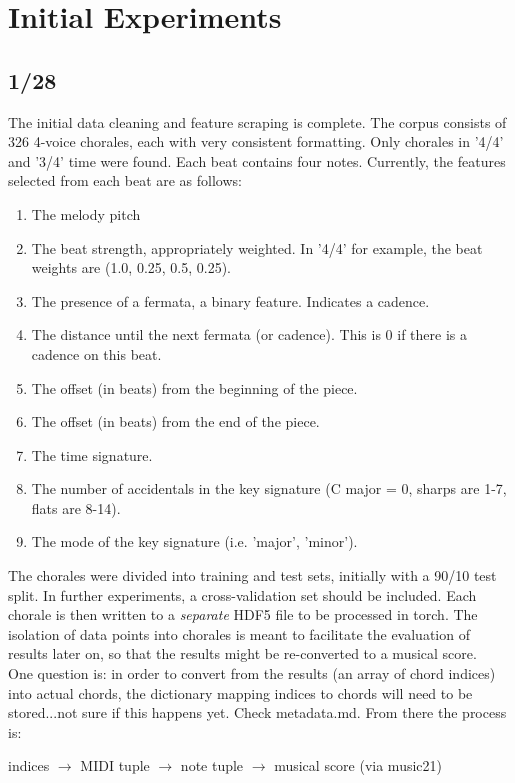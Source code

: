 \documentclass[12pt]{article}
\begin{document}
\maketitle


\section{Initial Experiments}

\subsection{1/28}
The initial data cleaning and feature scraping is complete. The corpus consists of 326 4-voice chorales, each with very consistent formatting. Only chorales in '4/4' and '3/4' time were found. Each beat contains four notes. Currently, the features selected from each beat are as follows:
\begin{enumerate}
\item The melody pitch
\item The beat strength, appropriately weighted. In '4/4' for example, the beat weights are (1.0, 0.25, 0.5, 0.25).
\item The presence of a fermata, a binary feature. Indicates a cadence.
\item The distance until the next fermata (or cadence). This is 0 if there is a cadence on this beat.
\item The offset (in beats) from the beginning of the piece.
\item The offset (in beats) from the end of the piece.
\item The time signature.
\item The number of accidentals in the key signature (C major = 0, sharps are 1-7, flats are 8-14).
\item The mode of the key signature (i.e. 'major', 'minor').
\end{enumerate}

The chorales were divided into training and test sets, initially with a 90/10 test split. In further experiments, a cross-validation set should be included. Each chorale is then written to a \textit{separate} HDF5 file to be processed in torch. The isolation of data points into chorales is meant to facilitate the evaluation of results later on, so that the results might be re-converted to a musical score. \\

One question is: in order to convert from the results (an array of chord indices) into actual chords, the dictionary mapping indices to chords will need to be stored...not sure if this happens yet. Check metadata.md. From there the process is:
\begin{center}
indices $\to$ MIDI tuple $\to$ note tuple $\to$ musical score (via music21)
\end{center}
\end{document}
